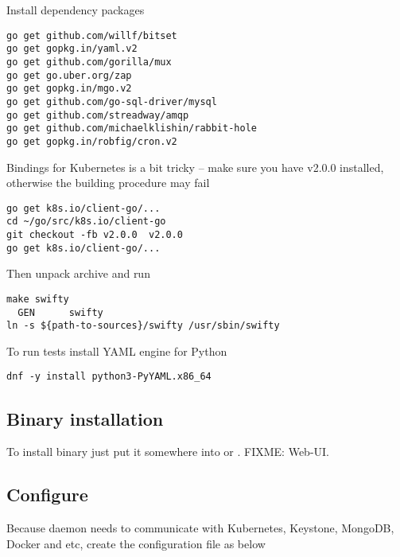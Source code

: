 Install dependency packages

\begin{lstlisting}
go get github.com/willf/bitset
go get gopkg.in/yaml.v2
go get github.com/gorilla/mux
go get go.uber.org/zap
go get gopkg.in/mgo.v2
go get github.com/go-sql-driver/mysql
go get github.com/streadway/amqp
go get github.com/michaelklishin/rabbit-hole
go get gopkg.in/robfig/cron.v2
\end{lstlisting}

Bindings for Kubernetes is a bit tricky -- make sure you have v2.0.0 installed,
otherwise the building procedure may fail

\begin{lstlisting}
go get k8s.io/client-go/...
cd ~/go/src/k8s.io/client-go
git checkout -fb v2.0.0  v2.0.0
go get k8s.io/client-go/...
\end{lstlisting}

Then unpack  archive and run

\begin{lstlisting}
make swifty
  GEN      swifty
ln -s ${path-to-sources}/swifty /usr/sbin/swifty
\end{lstlisting}

To run tests install YAML engine for Python

\begin{lstlisting}
dnf -y install python3-PyYAML.x86_64
\end{lstlisting}

\subsection{Binary installation}
\label{subsec:setup-swifty-bin}

To install binary just put it somewhere into 
or . FIXME: Web-UI.

\subsection{Configure}
\label{subsec:setup-swifty-conf}

Because  daemon needs to communicate with Kubernetes,
Keystone, MongoDB, Docker and etc, create the 
configuration file as below

